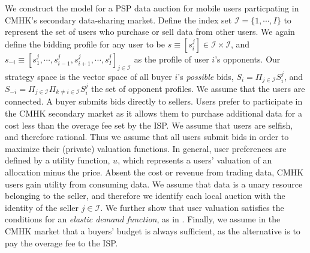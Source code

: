 \documentclass[sigconf, anonymous]{acmart}
\newcommand{\mcI}{\mathcal{I}}
\theoremstyle{definition}
\begin{document}
We construct the model for a PSP data auction for mobile users
particpating in CMHK's secondary data-sharing market.
Define the index set $\mcI = \lbrace 1, \cdots, I\rbrace$ to represent the set of users who purchase or sell
data from other users. We again define the bidding profile for any user to be 
$s \equiv
[s_i^j] \in \mcI \times \mcI$, and $s_{-i} \equiv [s_1^j , \cdots , s_{i-1}^j , s_{i+1}^j , \cdots
, s_I^j]_{j\in\mcI}$ as the profile of user $i$'s opponents. 
Our strategy space is the vector space of all buyer $i$'s \emph{possible} bids,
$S_i=\Pi_{j\in\mcI} S_i^j$, and $S_{-i} =\Pi_{j\in\mcI} \Pi_{k\ne i\in\mcI} S_i^j$ the
set of opponent profiles. We assume that the users are connected.
A buyer submits bids directly to sellers. Users prefer to participate in the CMHK secondary market as it allows them to purchase
additional data for a cost less than the overage fee set by the ISP. We assume
that users are selfish, and therefore rational. 
Thus we assume that all users submit bids in order to maximize their
(private) valuation functions. 
In general, user preferences are defined by a utility function, $u$, which 
represents a users' valuation of an allocation minus the price.
Absent the cost or revenue from trading data, CMHK users gain utility from consuming
data. 
We assume that data is a unary resource belonging to the seller, and
therefore we identify each local auction with the identity of the seller
$j\in\mcI$.
We further show that user valuation satisfies the conditions for an
\emph{elastic demand function}, as in \cite{lazar}.
Finally, we assume in the CMHK market that a buyers' budget is always
sufficient, as the alternative is to pay the overage fee to the ISP.
\end{document}
